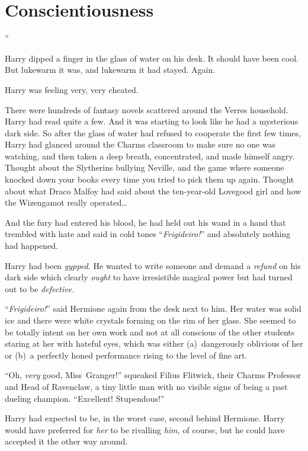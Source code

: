 \chapter{Conscientiousness}

”

\hplettrineextrapara
Harry dipped a finger in the glass of water on his desk. It should have been cool. But lukewarm it was, and lukewarm it had stayed. Again.

Harry was feeling very, very cheated.

There were hundreds of fantasy novels scattered around the Verres household. Harry had read quite a few. And it was starting to look like he had a mysterious dark side. So after the glass of water had refused to cooperate the first few times, Harry had glanced around the Charms classroom to make sure no one was watching, and then taken a deep breath, concentrated, and made himself angry. Thought about the Slytherins bullying Neville, and the game where someone knocked down your books every time you tried to pick them up again. Thought about what Draco Malfoy had said about the ten-year-old Lovegood girl and how the Wizengamot really operated…

And the fury had entered his blood, he had held out his wand in a hand that trembled with hate and said in cold tones “\emph{Frigideiro!}” and absolutely nothing had happened.

Harry had been \emph{gypped.} He wanted to write someone and demand a \emph{refund} on his dark side which clearly \emph{ought} to have irresistible magical power but had turned out to be \emph{defective.}

“\emph{Frigideiro!}” said Hermione again from the desk next to him. Her water was solid ice and there were white crystals forming on the rim of her glass. She seemed to be totally intent on her own work and not at all conscious of the other students staring at her with hateful eyes, which was either (a)~dangerously oblivious of her or (b)~a perfectly honed performance rising to the level of fine art.

“Oh, \emph{very} good, Miss~Granger!” squeaked Filius Flitwick, their Charms Professor and Head of Ravenclaw, a tiny little man with no visible signs of being a past dueling champion. “Excellent! Stupendous!”

Harry had expected to be, in the worst case, second behind Hermione. Harry would have preferred for \emph{her} to be rivalling \emph{him,} of course, but he could have accepted it the other way around.


